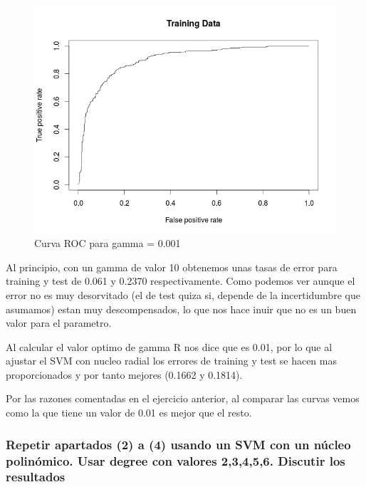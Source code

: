 \begin{figure}[H]
\centering
\includegraphics[scale=0.50]{ej1-55.png}
\caption{Curva ROC para gamma = 0.001}
\label{}
\end{figure}

Al principio, con un gamma de valor 10 obtenemos unas tasas de error para training y test de 0.061 y 0.2370 respectivamente. Como podemos ver aunque el error no es muy desorvitado (el de test quiza si, depende de la incertidumbre que asumamos) estan muy descompensados, lo que nos hace inuir que no es un buen valor para el parametro.

Al calcular el valor optimo de gamma R nos dice que es 0.01, por lo que al ajustar el SVM con nucleo radial los errores de training y test se hacen mas proporcionados y por tanto mejores (0.1662 y 0.1814).

Por las razones comentadas en el ejercicio anterior, al comparar las curvas vemos como la que tiene un valor de 0.01 es mejor que el resto.

\subsubsection{Repetir apartados (2) a (4) usando un SVM con un núcleo polinómico. Usar degree con valores 2,3,4,5,6. Discutir los resultados}

